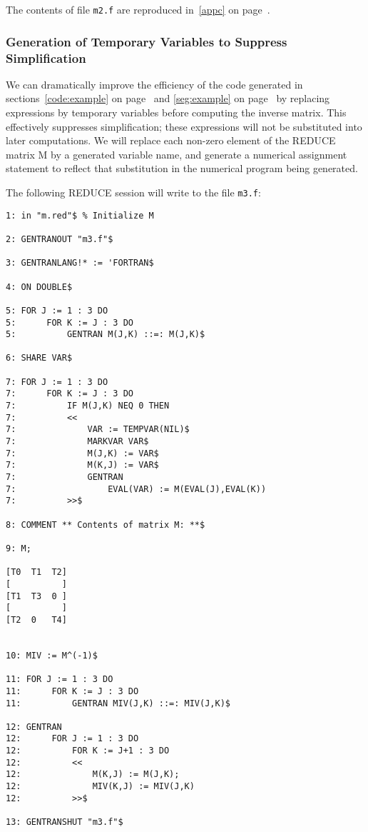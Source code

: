 The contents of file {\tt m2.f} are reproduced in~\ref{appc} on
page~\pageref{appc}.

\subsubsection{Generation of Temporary Variables to Suppress Simplification}
\label{tempvar:example}
We can dramatically improve the efficiency of the code generated
in sections~\ref{code:example} on page~\pageref{code:example} and
\ref{seg:example} on page~\pageref{seg:example}
by replacing expressions by temporary variables before computing the
inverse matrix.  This effectively suppresses simplification; these
expressions will not be substituted into later computations.  We
will replace each non-zero element of the REDUCE matrix M by a
generated variable name, and generate a numerical assignment statement
to reflect that substitution in the numerical program being generated.

The following REDUCE session will write to the file {\tt m3.f}:
\begin{verbatim}
1: in "m.red"$ % Initialize M

2: GENTRANOUT "m3.f"$

3: GENTRANLANG!* := 'FORTRAN$

4: ON DOUBLE$

5: FOR J := 1 : 3 DO
5:      FOR K := J : 3 DO
5:          GENTRAN M(J,K) ::=: M(J,K)$

6: SHARE VAR$

7: FOR J := 1 : 3 DO
7:      FOR K := J : 3 DO
7:          IF M(J,K) NEQ 0 THEN
7:          <<
7:              VAR := TEMPVAR(NIL)$
7:              MARKVAR VAR$
7:              M(J,K) := VAR$
7:              M(K,J) := VAR$
7:              GENTRAN
7:                  EVAL(VAR) := M(EVAL(J),EVAL(K))
7:          >>$

8: COMMENT ** Contents of matrix M: **$

9: M;

[T0  T1  T2]
[          ]
[T1  T3  0 ]
[          ]
[T2  0   T4]


10: MIV := M^(-1)$

11: FOR J := 1 : 3 DO
11:      FOR K := J : 3 DO
11:          GENTRAN MIV(J,K) ::=: MIV(J,K)$

12: GENTRAN
12:      FOR J := 1 : 3 DO
12:          FOR K := J+1 : 3 DO
12:          <<
12:              M(K,J) := M(J,K);
12:              MIV(K,J) := MIV(J,K)
12:          >>$

13: GENTRANSHUT "m3.f"$
\end{verbatim}

